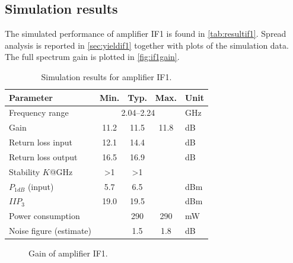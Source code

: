 		\subsection{Simulation results}
			The simulated performance of amplifier IF1 is found in \autoref{tab:resultif1}. Spread analysis is reported in \autoref{sec:yieldif1} together with plots of the simulation data.  The full spectrum gain is plotted in \autoref{fig:if1gain}.

			\begin{table}[hbt!]
				\caption[Simulation results for amplifier IF1.]{Simulation results for amplifier IF1.\disclaimer}
				\label{tab:resultif1}
				\centering
				\begin{tabular}{ l c c c l } \toprule
					Parameter & Min. & Typ. & Max. & Unit \\\midrule
					Frequency range & \multicolumn{3}{c}{2.04--2.24} & GHz \\
					Gain & 11.2 & 11.5 & 11.8 & dB \\
					Return loss input & 12.1 & 14.4 &  & dB \\
					Return loss output & 16.5 & 16.9 &  & dB \\
					Stability $K$@\unit[0--80]{GHz} & >1 & >1 &  &  \\
					$P_{1dB}$ (input) & 5.7 & 6.5 &  & dBm \\
					$IIP_3$ & 19.0 & 19.5 &  & dBm \\
					Power consumption &  & 290 & 290 & mW \\
					Noise figure (estimate) &  & 1.5 & 1.8 & dB \\\bottomrule
				\end{tabular}
			\end{table}

			\begin{figure}[hbt!]
				\centering
				\caption[Amplifier IF1 gain.]{Gain of amplifier IF1.}\label{fig:if1gain}
			\end{figure}


